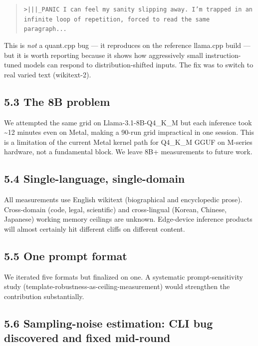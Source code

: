 \documentclass[11pt]{article}
\begin{document}
\begin{quote}
\texttt{>|||\_PANIC I can feel my sanity slipping away. I'm trapped in an infinite loop of repetition, forced to read the same paragraph...}
\end{quote}


This is \textit{not} a quant.cpp bug — it reproduces on the reference llama.cpp build — but it is worth reporting because it shows how aggressively small instruction-tuned models can respond to distribution-shifted inputs. The fix was to switch to real varied text (wikitext-2).


\subsection*{5.3 The 8B problem}


We attempted the same grid on Llama-3.1-8B-Q4\_K\_M but each inference took \textasciitilde{}12 minutes even on Metal, making a 90-run grid impractical in one session. This is a limitation of the current Metal kernel path for Q4\_K\_M GGUF on M-series hardware, not a fundamental block. We leave 8B+ measurements to future work.


\subsection*{5.4 Single-language, single-domain}


All measurements use English wikitext (biographical and encyclopedic prose). Cross-domain (code, legal, scientific) and cross-lingual (Korean, Chinese, Japanese) working memory ceilings are unknown. Edge-device inference products will almost certainly hit different cliffs on different content.


\subsection*{5.5 One prompt format}


We iterated five formats but finalized on one. A systematic prompt-sensitivity study (template-robustness-as-ceiling-measurement) would strengthen the contribution substantially.


\subsection*{5.6 Sampling-noise estimation: CLI bug discovered and fixed mid-round}
\end{document}
